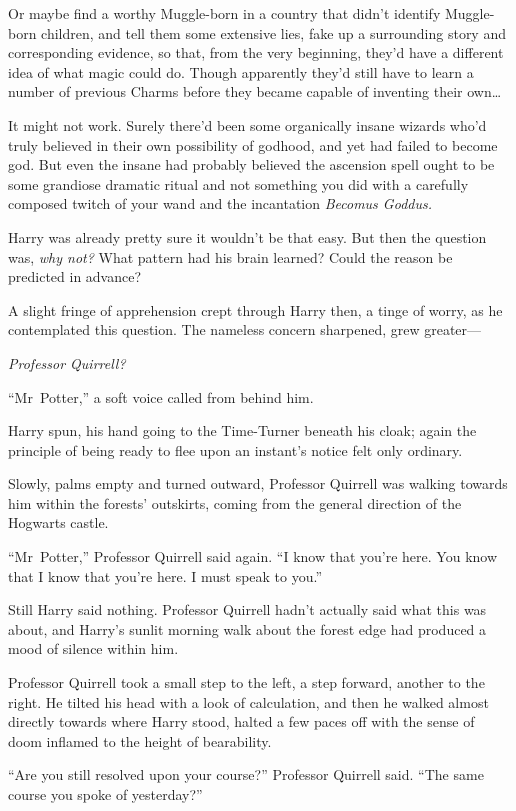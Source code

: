 Or maybe find a worthy Muggle-born in a country that didn’t identify Muggle-born children, and tell them some extensive lies, fake up a surrounding story and corresponding evidence, so that, from the very beginning, they’d have a different idea of what magic could do. Though apparently they’d still have to learn a number of previous Charms before they became capable of inventing their own…

It might not work. Surely there’d been some organically insane wizards who’d truly believed in their own possibility of godhood, and yet had failed to become god. But even the insane had probably believed the ascension spell ought to be some grandiose dramatic ritual and not something you did with a carefully composed twitch of your wand and the incantation \emph{Becomus Goddus.}

Harry was already pretty sure it wouldn’t be that easy. But then the question was, \emph{why not?} What pattern had his brain learned? Could the reason be predicted in advance?

A slight fringe of apprehension crept through Harry then, a tinge of worry, as he contemplated this question. The nameless concern sharpened, grew greater—

\emph{Professor Quirrell?}

“Mr~Potter,” a soft voice called from behind him.

Harry spun, his hand going to the Time-Turner beneath his cloak; again the principle of being ready to flee upon an instant’s notice felt only ordinary.

Slowly, palms empty and turned outward, Professor Quirrell was walking towards him within the forests’ outskirts, coming from the general direction of the Hogwarts castle.

“Mr~Potter,” Professor Quirrell said again. “I know that you’re here. You know that I know that you’re here. I must speak to you.”

Still Harry said nothing. Professor Quirrell hadn’t actually said what this was about, and Harry’s sunlit morning walk about the forest edge had produced a mood of silence within him.

Professor Quirrell took a small step to the left, a step forward, another to the right. He tilted his head with a look of calculation, and then he walked almost directly towards where Harry stood, halted a few paces off with the sense of doom inflamed to the height of bearability.

“Are you still resolved upon your course?” Professor Quirrell said. “The same course you spoke of yesterday?”


